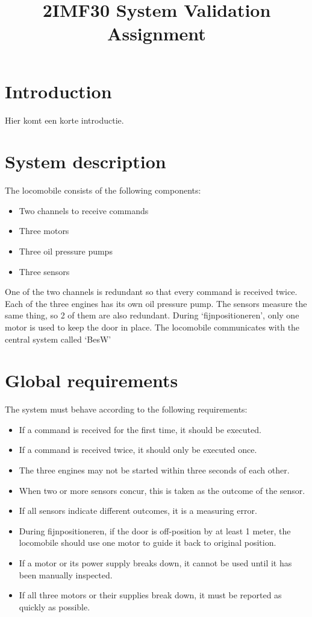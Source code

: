 \documentclass{article}
\title{2IMF30 System Validation Assignment}
\begin{document}
\section{Introduction}
Hier komt een korte introductie.

\section{System description}
The locomobile consists of the following components:
\begin{itemize}
    \item Two channels to receive commands
    \item Three motors
    \item Three oil pressure pumps
    \item Three sensors
\end{itemize}

One of the two channels is redundant so that every command is received twice. Each of the three engines has its own oil pressure pump. The sensors measure the same thing, so 2 of them are also redundant. During `fijnpositioneren', only one motor is used to keep the door in place. The locomobile communicates with the central system called `BesW'

\section{Global requirements}
The system must behave according to the following requirements:
\begin {itemize}
    \item If a command is received for the first time, it should be executed.
    \item If a command is received twice, it should only be executed once. 
    \item The three engines may not be started within three seconds of each other.
    \item When two or more sensors concur, this is taken as the outcome of the sensor.
    \item If all sensors indicate different outcomes, it is a measuring error.
    \item During fijnpositioneren, if the door is off-position by at least 1 meter, the locomobile should use one motor to guide it back to original position.

    \item If a motor or its power supply breaks down, it cannot be used until it has been manually inspected.
    \item If all three motors or their supplies break down, it must be reported as quickly as possible.
\end {itemize}
\end{document}
